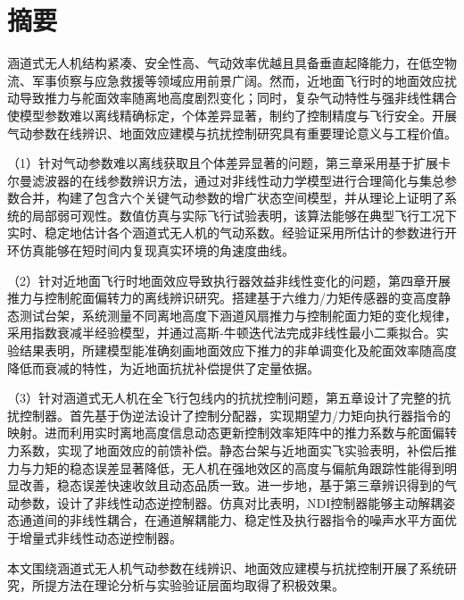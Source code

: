 \chapter{摘\texorpdfstring{\quad}{}要}
涵道式无人机结构紧凑、安全性高、气动效率优越且具备垂直起降能力，在低空物流、军事侦察与应急救援等领域应用前景广阔。然而，近地面飞行时的地面效应扰动导致推力与舵面效率随离地高度剧烈变化；同时，复杂气动特性与强非线性耦合使模型参数难以离线精确标定，个体差异显著，制约了控制精度与飞行安全。开展气动参数在线辨识、地面效应建模与抗扰控制研究具有重要理论意义与工程价值。

（1）针对气动参数难以离线获取且个体差异显著的问题，第三章采用基于扩展卡尔曼滤波器的在线参数辨识方法，通过对非线性动力学模型进行合理简化与集总参数合并，构建了包含六个关键气动参数的增广状态空间模型，并从理论上证明了系统的局部弱可观性。数值仿真与实际飞行试验表明，该算法能够在典型飞行工况下实时、稳定地估计各个涵道式无人机的气动系数。经验证采用所估计的参数进行开环仿真能够在短时间内复现真实环境的角速度曲线。

（2）针对近地面飞行时地面效应导致执行器效益非线性变化的问题，第四章开展推力与控制舵面偏转力的离线辨识研究。搭建基于六维力/力矩传感器的变高度静态测试台架，系统测量不同离地高度下涵道风扇推力与控制舵面力矩的变化规律，采用指数衰减半经验模型，并通过高斯‑牛顿迭代法完成非线性最小二乘拟合。实验结果表明，所建模型能准确刻画地面效应下推力的非单调变化及舵面效率随高度降低而衰减的特性，为近地面抗扰补偿提供了定量依据。

（3）针对涵道式无人机在全飞行包线内的抗扰控制问题，第五章设计了完整的抗扰控制器。首先基于伪逆法设计了控制分配器，实现期望力/力矩向执行器指令的映射。进而利用实时离地高度信息动态更新控制效率矩阵中的推力系数与舵面偏转力系数，实现了地面效应的前馈补偿。静态台架与近地面实飞实验表明，补偿后推力与力矩的稳态误差显著降低，无人机在强地效区的高度与偏航角跟踪性能得到明显改善，稳态误差快速收敛且动态品质一致。进一步地，基于第三章辨识得到的气动参数，设计了非线性动态逆控制器。仿真对比表明，NDI控制器能够主动解耦姿态通道间的非线性耦合，在通道解耦能力、稳定性及执行器指令的噪声水平方面优于增量式非线性动态逆控制器。

本文围绕涵道式无人机气动参数在线辨识、地面效应建模与抗扰控制开展了系统研究，所提方法在理论分析与实验验证层面均取得了积极效果。
 
